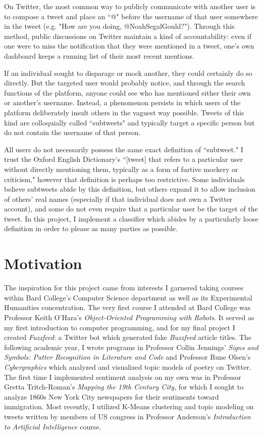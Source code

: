 \documentclass[11pt, twoside, reqno]{book}
\begin{document}
On Twitter, the most common way to publicly communicate with another user is to compose a tweet and place an ``@" before the username of that user somewhere in the tweet (e.g. "How are you doing, @NoahSegalGould?"). Through this method, public discussions on Twitter maintain a kind of accountability: even if one were to miss the notification that they were mentioned in a tweet, one's own dashboard keeps a running list of their most recent mentions. 

If an individual sought to disparage or mock another, they could certainly do so directly. But the targeted user would probably notice, and through the search functions of the platform, anyone could see who has mentioned either their own or another's username. Instead, a phenomenon persists in which users of the platform deliberately insult others in the vaguest way possible. Tweets of this kind are colloquially called ``subtweets" and typically target a specific person but do not contain the username of that person.

All users do not necessarily possess the same exact definition of ``subtweet." I trust the Oxford English Dictionary's ``[tweet] that refers to a particular user without directly mentioning them, typically as a form of furtive mockery or criticism," however that definition is perhaps too restrictive. Some individuals believe subtweets abide by this definition, but others expand it to allow inclusion of others' real names (especially if that individual does not own a Twitter account), and some do not even require that a particular user be the target of the tweet. In this project, I implement a classifier which abides by a particularly loose definition in order to please as many parties as possible. 

\section{Motivation}
\label{motivation_and_prior_work}

The inspiration for this project came from interests I garnered taking courses within Bard College's Computer Science department as well as its Experimental Humanities concentration. The very first course I attended at Bard College was Professor Keith O'Hara's \textit{Object-Oriented Programming with Robots}. It served as my first introduction to computer programming, and for my final project I created \textit{Fuzzfeed}: a Twitter bot which generated fake \textit{Buzzfeed} article titles. The following academic year, I wrote programs in Professor Collin Jennings' \textit{Signs and Symbols: Patter Recognition in Literature and Code} and Professor Rune Olsen's \textit{Cybergraphics} which analyzed and visualized topic models of poetry on Twitter. The first time I implemented sentiment analysis on my own was in Professor Gretta Tritch-Roman's \textit{Mapping the 19th Century City}, for which I sought to analyze 1860s New York City newspapers for their sentiments toward immigration. Most recently, I utilized K-Means clustering and topic modeling on tweets written by members of US congress in Professor Anderson's \textit{Introduction to Artificial Intelligence} course.
\end{document}
